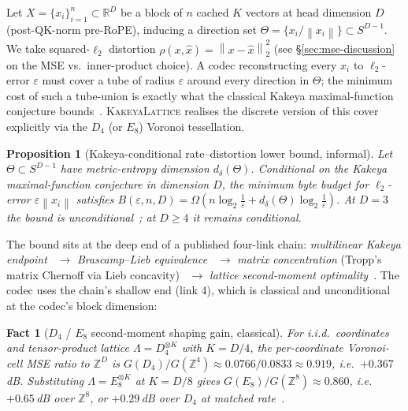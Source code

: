 \documentclass[10pt,a4paper]{article}
\theoremstyle{definition}
\theoremstyle{plain}
\newtheorem{proposition}[theorem]{Proposition}
\newtheorem{fact}[theorem]{Fact}
\newcommand{\R}{\mathbb{R}}
\newcommand{\Z}{\mathbb{Z}}
\newcommand{\norm}[1]{\left\lVert#1\right\rVert}
\begin{document}
Let $X = \{x_i\}_{i=1}^n \subset \R^D$ be a block of $n$ cached $K$
vectors at head dimension $D$ (post-QK-norm pre-RoPE), inducing a
direction set $\Theta = \{x_i/\norm{x_i}\} \subset S^{D-1}$. We
take squared-$\ell_2$ distortion
$\rho(x,\hat x)=\norm{x-\hat x}_2^2$ (see \S\ref{sec:mse-discussion}
on the MSE vs.\ inner-product choice). A codec reconstructing every
$x_i$ to $\ell_2$-error $\varepsilon$ must cover a tube of radius
$\varepsilon$ around every direction in $\Theta$; the minimum cost
of such a tube-union is exactly what the classical Kakeya
maximal-function conjecture
bounds~\cite{kakeya-problem,besicovitch-1919,wolff-kakeya,tao-kakeya-survey}.
\textsc{KakeyaLattice} realises the discrete version of this cover
explicitly via the $D_4$ (or $E_8$) Voronoi tessellation.

\begin{proposition}[Kakeya-conditional rate--distortion lower bound, informal]
\label{prop:kakeya-rd}
Let $\Theta \subset S^{D-1}$ have metric-entropy dimension
$d_\delta(\Theta)$. Conditional on the Kakeya maximal-function
conjecture in dimension $D$, the minimum byte budget for
$\ell_2$-error $\varepsilon\norm{x_i}$ satisfies
$B(\varepsilon,n,D) = \Omega(n\log_2\tfrac{1}{\varepsilon}
+ d_\delta(\Theta)\log_2\tfrac{1}{\varepsilon})$. At $D=3$ the bound
is unconditional~\cite{wang-zahl}; at $D\geq 4$ it remains
conditional.
\end{proposition}

The bound sits at the deep end of a published four-link chain:
\emph{multilinear Kakeya
endpoint}~\cite{guth-endpoint,carbery-valdimarsson}
$\to$ \emph{Brascamp--Lieb
equivalence}~\cite{bennett-carbery-christ-tao} $\to$ \emph{matrix
concentration} (Tropp's matrix Chernoff via Lieb
concavity)~\cite{tropp-matrix-chernoff} $\to$ \emph{lattice
second-moment
optimality}~\cite{zamir-feder,conway-sloane-book}. The codec uses
the chain's shallow end (link 4), which is classical and
unconditional at the codec's block dimension:

\begin{fact}[$D_4$ / $E_8$ second-moment shaping gain, classical]
\label{prop:d4-kakeya}
For i.i.d.\ coordinates and tensor-product lattice $\Lambda =
D_4^{\otimes K}$ with $K = D/4$, the per-coordinate Voronoi-cell
MSE ratio to $\Z^D$ is
$G(D_4)/G(\Z^4) \approx 0.0766/0.0833 \approx 0.919$, i.e.\
$+0.367\,$dB. Substituting $\Lambda = E_8^{\otimes K}$ at $K = D/8$
gives $G(E_8)/G(\Z^8) \approx 0.860$, i.e.\ $+0.65\,$dB over
$\Z^8$, or $+0.29\,$dB over $D_4$ at matched
rate~\cite{zamir-feder,conway-sloane-book,eyuboglu-forney,erez-zamir}.
\end{fact}
\end{document}
